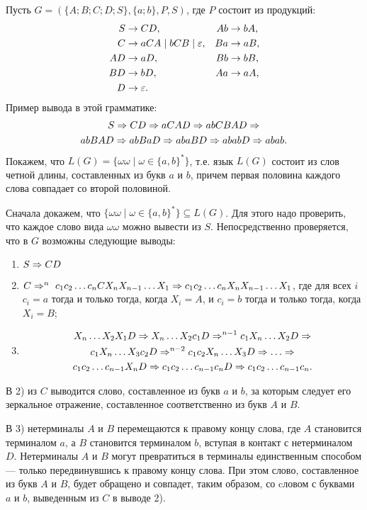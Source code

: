 \begin{myexample}
\label{exampleFreeGrammar}
Пусть $G=(\{A;B;C;D;S\},\{a;b\},P,S)$, где $P$ состоит из продукций:
\begin{align*}
	S  &\to CD, &
    Ab &\to bA, \\
	C  &\to aCA \mid bCB \mid \varepsilon, &
    Ba &\to aB, \\
	AD &\to aD, &
    Bb &\to bB, \\
	BD &\to bD, &
    Aa &\to aA,\\
	D  &\to \varepsilon.
\end{align*}
Пример вывода в этой грамматике:
\begin{multline*}
	S \Rightarrow
    CD \Rightarrow 
    aCAD \Rightarrow
    abCBAD \Rightarrow \\
    abBAD \Rightarrow 
    abBaD \Rightarrow 
    abaBD \Rightarrow 
    ababD \Rightarrow 
    abab.
\end{multline*}
Покажем, что $L(G)=\{\omega\omega\mid\omega\in\{a,b\}^*\}$, т.е. язык $L(G)$ состоит из слов четной длины, составленных из букв $a$ и $b$, причем первая половина каждого слова совпадает со второй половиной.

Сначала докажем, что $\{\omega\omega\mid\omega\in\{a,b\}^*\}\subseteq L(G)$. Для этого надо проверить, что каждое слово вида $\omega\omega$ можно вывести из $S$. Непосредственно проверяется, что в $G$ возможны следующие выводы:
\begin{enumerate}
	\item $S \Rightarrow CD$
	\item $C \Rightarrow^n~c_1c_2\ldots c_nCX_nX_{n-1}\ldots X_1 \Rightarrow c_1c_2\ldots c_nX_nX_{n-1}\ldots X_1$,  где для всех $i$ $c_i=a$ тогда и только тогда, когда $X_i=A$, и $c_i=b$ тогда и только тогда, когда $X_i=B$;
	\item
\begin{multline*}
    X_n\ldots X_2X_1D \To X_n\ldots X_2c_1D \To^{n-1} c_1X_n \ldots X_2D \To \\
     c_1X_n\ldots X_3c_2D \To^{n-2} c_1c_2X_n \ldots X_3D \To \dots \To \\
     c_1c_2\ldots c_{n-1}X_nD \To c_1c_2\ldots c_{n-1}c_nD \To c_1c_2\ldots c_{n-1}c_n.
\end{multline*}
\end{enumerate}

В 2) из $C$ выводится слово, составленное из букв $a$ и $b$, за которым следует его зеркальное отражение, составленное соответственно из букв $A$ и $B$.

В 3) нетерминалы $A$ и $B$ перемещаются к правому концу слова, где $A$ становится терминалом $a$, а $B$ становится терминалом $b$, вступая в контакт с нетерминалом $D$. Нетерминалы $A$ и $B$ могут превратиться в терминалы единственным способом --- только передвинувшись к правому концу слова. При этом слово, составленное из букв $A$ и $B$, будет обращено и совпадет, таким образом, со cловом с буквами $a$ и $b$, выведенным из $C$ в выводе 2).


\end{myexample}
